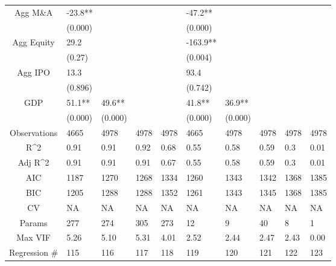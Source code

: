 \documentclass{article}
\begin{document}
\begin{table}[H]
\begin{tabular}{|clllllllll|}
  Agg M\&A & -23.8** &  &  &  & -47.2** &  &  &  &  \\
   & (0.000) &  &  &  & (0.000) &  &  &  &  \\
  Agg Equity & 29.2 &  &  &  & -163.9** &  &  &  &  \\
   & (0.27) &  &  &  & (0.004) &  &  &  &  \\
  Agg IPO & 13.3 &  &  &  & 93.4 &  &  &  &  \\
   & (0.896) &  &  &  & (0.742) &  &  &  &  \\
  GDP & 51.1** & 49.6** &  &  & 41.8** & 36.9** &  &  &  \\
   & (0.000) & (0.000) &  &  & (0.000) & (0.000) &  &  &  \\
  \hline
 Observations & 4665 & 4978 & 4978 & 4978 & 4665 & 4978 & 4978 & 4978 & 4978 \\
  R^2 & 0.91 & 0.91 & 0.92 & 0.68 & 0.55 & 0.58 & 0.59 & 0.3 & 0.01 \\
  Adj R^2 & 0.91 & 0.91 & 0.91 & 0.67 & 0.55 & 0.58 & 0.59 & 0.3 & 0.01 \\
  AIC & 1187 & 1270 & 1268 & 1334 & 1260 & 1343 & 1342 & 1368 & 1385 \\
  BIC & 1205 & 1288 & 1288 & 1352 & 1261 & 1343 & 1345 & 1368 & 1385 \\
  CV & NA & NA & NA & NA & NA & NA & NA & NA & NA \\
  Params & 277 & 274 & 305 & 273 & 12 & 9 & 40 & 8 & 1 \\
  Max VIF & 5.26 & 5.10 & 5.31 & 4.01 & 2.52 & 2.44 & 2.47 & 2.43 & 0.00 \\
  Regression \# & 115 & 116 & 117 & 118 & 119 & 120 & 121 & 122 & 123 \\
   \hline
\end{tabular}

\end{table}
\end{document}
